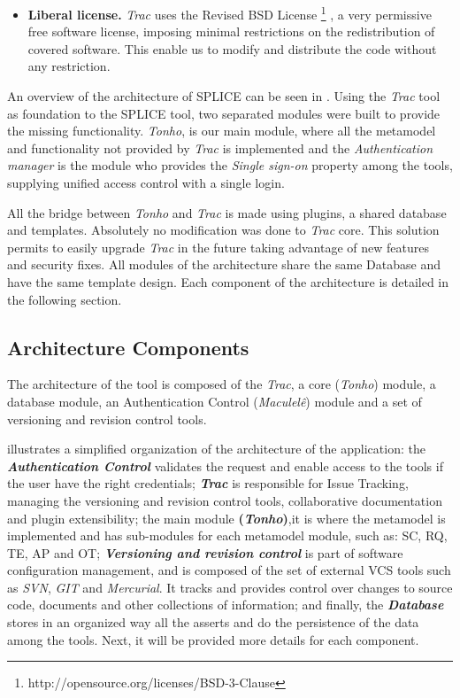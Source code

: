 \begin{itemize}
\item  \textbf{ Liberal license. } \textit{Trac} uses the Revised BSD License \footnote{http://opensource.org/licenses/BSD-3-Clause} , a very permissive free software license, imposing minimal restrictions on the redistribution of covered software. This enable us to modify and distribute the code without any restriction.

\end{itemize}

An overview of the architecture of \ac{SPLICE} can be seen in . Using the \textit{Trac} tool as foundation to the \ac{SPLICE} tool, two separated modules were built to provide the missing functionality. \textit{Tonho}, is our main module, where all the metamodel and functionality not provided by \textit{Trac} is implemented and the \textit{Authentication manager} is the module who provides the \textit{Single sign-on} property among the tools, supplying unified access control with a single login.

All the bridge between \textit{Tonho} and \textit{Trac} is made using plugins, a shared database and templates. Absolutely no modification was done to \textit{Trac} core. This solution permits to easily upgrade \textit{Trac} in the future taking advantage of new features and security fixes.	All modules of the architecture share the same Database and have the same template design.  Each component of the architecture is detailed in the following section.


\subsection{Architecture Components}
The architecture of the tool is composed of the \textit{Trac}, a core (\textit{Tonho}) module, a database module, an Authentication Control (\textit{Maculelê}) module and a set of versioning and revision control tools.

  illustrates a simplified organization of the architecture of the application: the \textbf{\textit{Authentication Control}} validates the request and enable access to the tools if the user have the right credentials; \textbf{\textit{Trac}} is responsible for Issue Tracking, managing the versioning and revision control tools, collaborative documentation and plugin extensibility; the main module \textbf{(\textit{Tonho})},it is where the metamodel is implemented and has sub-modules for each metamodel module, such as: \acf{SC}, \acf{RQ}, \acf{TE}, \acf{AP} and \acf{OT};\textbf{ \textit {Versioning and revision control}} is part of  software configuration management, and is composed of the set of external \acf{VCS} tools such as \textit{SVN}, \textit{GIT} and \textit{Mercurial}. It tracks and provides control over changes to source code, documents and other collections of information; and finally, the \textbf{\textit{Database}} stores in an organized way all the asserts and do the persistence of the data among the tools. Next, it will be provided more details for each component.

